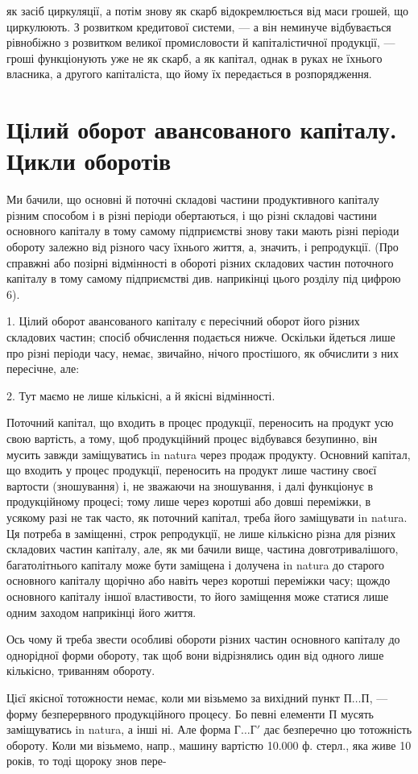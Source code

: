 \parcont{}  %
як засіб циркуляції, а потім знову як скарб відокремлюється від маси
грошей, що циркулюють. З розвитком кредитової системи, — а він неминуче
відбувається рівнобіжно з розвитком великої промисловости й капіталістичної
продукції, — гроші функціонують уже не як скарб, а як капітал,
однак в руках не їхнього власника, а другого капіталіста, що йому
їх передається в розпорядження.

\section{Цілий оборот авансованого капіталу. Цикли
оборотів}

Ми бачили, що основні й поточні складові частини продуктивного
капіталу різним способом і в різні періоди обертаються, і що різні складові
частини основного капіталу в тому самому підприємстві знову таки
мають різні періоди обороту залежно від різного часу їхнього життя, а,
значить, і репродукції. (Про справжні або позірні відмінності в обороті
різних складових частин поточного капіталу в тому самому підприємстві
див. наприкінці цього розділу під цифрою 6).

1. Цілий оборот авансованого капіталу є пересічний оборот його різних
складових частин; спосіб обчислення подається нижче. Оскільки
йдеться лише про різні періоди часу, немає, звичайно, нічого простішого,
як обчислити з них пересічне, але:

2. Тут маємо не лише кількісні, а й якісні відмінності.

Поточний капітал, що входить в процес продукції, переносить на
продукт усю свою вартість, а тому, щоб продукційний процес відбувався
безупинно, він мусить завжди заміщуватись in natura через продаж
продукту. Основний капітал, що входить у процес продукції, переносить
на продукт лише частину своєї вартости (зношування) і, не зважаючи на
зношування, і далі функціонує в продукційному процесі; тому лише через
коротші або довші переміжки, в усякому разі не так часто, як поточний
капітал, треба його заміщувати in natura. Ця потреба в заміщенні, строк
репродукції, не лише кількісно різна для різних складових частин капіталу,
але, як ми бачили вище, частина довготривалішого, багатолітнього
капіталу може бути заміщена і долучена in natura до старого основного
капіталу щорічно або навіть через коротші переміжки часу; щождо основного
капіталу іншої властивости, то його заміщення може статися лише
одним заходом наприкінці його життя.

Ось чому й треба звести особливі обороти різних частин основного
капіталу до однорідної форми обороту, так щоб вони відрізнялись один
від одного лише кількісно, триванням обороту.

Цієї якісної тотожности немає, коли ми візьмемо за вихідний пункт
$П\dots{} П$, — форму безперервного продукційного процесу. Бо певні елементи
П мусять заміщуватись in natura, а інші ні. Але форма $Г\dots{} Г'$ дає безперечно
цю тотожність обороту. Коли ми візьмемо, напр., машину вартістю
10.000 ф. стерл., яка живе 10 років, то тоді щороку знов пере-
\parbreak{}  %

